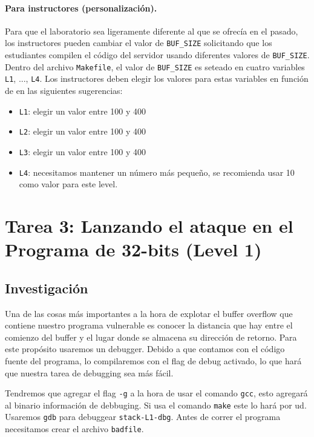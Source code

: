 \paragraph{Para instructores (personalización).}
Para que el laboratorio sea ligeramente diferente al que se ofrecía en el pasado,
los instructores pueden cambiar el valor de \texttt{BUF\_SIZE} solicitando
que los estudiantes compilen el código del servidor usando diferentes valores de \texttt {BUF\_SIZE}.
Dentro del archivo \texttt{Makefile}, el valor de \texttt{BUF\_SIZE} es seteado en 
cuatro variables \texttt{L1}, ..., \texttt{L4}.
Los instructores deben elegir los valores para estas variables en función de
en las siguientes sugerencias:

\begin{itemize}[noitemsep]
\item \texttt{L1}: elegir un valor entre 100 y 400
\item \texttt{L2}: elegir un valor entre 100 y 400
\item \texttt{L3}: elegir un valor entre 100 y 400
\item \texttt{L4}: necesitamos mantener un número más pequeño, se recomienda usar 10 como valor para este level.
\end{itemize}
 


\section{Tarea 3: Lanzando el ataque en el Programa de 32-bits (Level 1)}

\subsection{Investigación} 

Una de las cosas más importantes a la hora de explotar el buffer overflow que contiene nuestro programa vulnerable es conocer la distancia que hay entre el comienzo del buffer y el lugar donde se almacena su dirección de retorno.
Para este propósito usaremos un debugger.
Debido a que contamos con el código fuente del programa, lo compilaremos con el flag de debug activado, lo que hará que nuestra tarea de debugging sea más fácil.

Tendremos que agregar el flag \texttt{-g} a la hora de usar el comando \texttt{gcc}, esto agregará al binario información de debbuging. Si usa el comando \texttt{make} este lo hará por ud. 
Usaremos \texttt{gdb} para debuggear \texttt{stack-L1-dbg}.
Antes de correr el programa necesitamos crear el archivo \texttt{badfile}.


